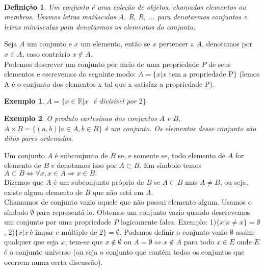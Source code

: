 \documentclass[10pt]{article}
\newtheorem{defn}{Definição}
\newtheorem{exemplo}{Exemplo}
\begin{document}
\\
\begin{defn} Um conjunto é uma coleção de objetos, chamados elementos ou membros. Usamos letras maiúsculas A, B, R, ... para denotarmos conjuntos e letras minúsculas para denotarmos os elementos do conjunto.  
\end{defn}
Seja  $A$ um conjunto e $x$ um elemento, então se $x$ pertencer a $A$, denotamos por $x\in A$, caso contrário $x\not\in A$. \\
\noindent Podemos descrever um conjunto por meio de uma propriedade $P$ de seus elementos  e escrevemos do seguinte modo: $A=\{x| x\, \, \mbox{tem a propriedade P}\}$ (lemos A é o conjunto dos elementos x tal que x satisfaz a propriedade P).\\
\begin{exemplo} $A=\{x\in \mathbb{R}| x \, \, $ é divisível por $2\}$\end{exemplo}
\begin{exemplo} O produto cartesinao dos conjuntos $A$ e $B$, $A\times B=\{(a,b)| a\in A, b\in B\} $ é um conjunto. Os elementos desse conjunto são ditos pares ordenados.\end{exemplo}
 Um conjunto $A$ é subconjunto de $B$ se, e somente se, todo elemento de $A$ for elemento de $B$ e denotamos isso por $A\subset B$. Em símbolo temos $A\subset B\Leftrightarrow \forall x, x\in A\Rightarrow x\in B.$\\
\noindent  Dizemos que $A$ é um subconjunto próprio de $B$ se $A\subset B$ mas $A\neq B$, ou seja, existe algum elemento de $B$ que não está em $A$. \\
 Chamamos de conjunto vazio aquele que não possui elemento algum. Usamos o símbolo $\emptyset$ para representá-lo. Obtemos um conjunto vazio quando descrevemos um conjunto por uma propriedade $P$ logicamente falsa.  Exemplo: 1)$\{x| x\neq x\}=\emptyset$, 2)$\{x| x\, \mbox{é impar e múltiplo de 2}\}=\emptyset$. Podemos definir o conjunto vazio $\emptyset$ assim: qualquer que seja $x$, tem-se que $x\not\in \emptyset$ ou $A=\emptyset \Leftrightarrow x\not\in A$ para todo $x\in E$ onde $E$ é o conjunto universo (ou seja o conjunto que contém todos os conjuntos que ocorrem numa certa discussão).
\end{document}
